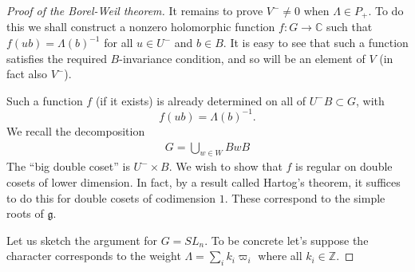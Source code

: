 \documentclass[12pt]{article}
\theoremstyle{plain}
\theoremstyle{definition}
\numberwithin{equation}{section}
\newcommand{\La}{\Lambda}
\newcommand{\C}{\mathbb{C}}
\newcommand{\Z}{\mathbb{Z}}
\newcommand{\g}{\mathfrak{g}}
\begin{document}
\begin{proof}[Proof of the Borel-Weil theorem]
It remains to prove $V^- \neq 0$ when $\Lambda \in P_+$. To do this we shall construct a nonzero holomorphic function $f : G \rightarrow \C$ such that $f(ub) = \Lambda(b)^{-1}$ for all $u \in U^-$ and $b \in B$. It is easy to see that such a function satisfies the required $B$-invariance condition, and so will be an element of $V$ (in fact also $V^-$).

Such a function $f$ (if it exists) is already determined on all of $U^-B \subset G$, with
\[
f(u b) = \Lambda(b)^{-1}.
\]
We recall the decomposition
\begin{align}\label{eq:Bru.dec}
G = \bigcup_{w \in W} B w B
\end{align}
The ``big double coset'' is $U^- \times B$. We wish to show that $f$ is regular on double cosets of lower dimension. In fact, by a result called Hartog's theorem, it suffices to do this for double cosets of codimension $1$. These correspond to the simple roots of $\g$.

Let us sketch the argument for $G = SL_n$. To be concrete let's suppose the character corresponds to the weight $\La = \sum_{i} k_i \varpi_i$ where all $k_i \in \Z$.


\end{proof}
\end{document}
